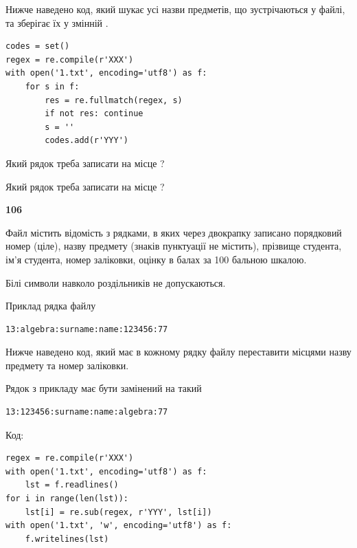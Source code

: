 Нижче наведено код, який шукає усі назви предметів, що зустрічаються у файлі, та зберігає їх у змінній .



\begin{verbatim}
codes = set()
regex = re.compile(r'XXX')
with open('1.txt', encoding='utf8') as f:
    for s in f:
        res = re.fullmatch(regex, s)
        if not res: continue
        s = ''
        codes.add(r'YYY')
\end{verbatim}





Який рядок треба записати на місце  ?\par
\vspace{5mm}


Який рядок треба записати на місце  ?\par


\newpage

{\begin {center}\textbf{ 106}\end {center}}\par
Файл  містить відомість з рядками, в яких через двокрапку записано поряд\-ковий номер (ціле), назву предмету (знаків пунктуації не містить), прізвище студента, ім'я студента, номер заліковки, оцінку в балах за 100 бальною шкалою.

Білі символи навколо роздільників не допускаються.

Приклад рядка файлу



\begin{verbatim}
13:algebra:surname:name:123456:77
\end{verbatim}


Нижче наведено код, який має в кожному рядку файлу переставити місцями назву предмету та номер заліковки.

Рядок з прикладу має бути замінений на такий



\begin{verbatim}
13:123456:surname:name:algebra:77
\end{verbatim}




Код:



\begin{verbatim}
regex = re.compile(r'XXX')
with open('1.txt', encoding='utf8') as f:
    lst = f.readlines()
for i in range(len(lst)):
    lst[i] = re.sub(regex, r'YYY', lst[i])
with open('1.txt', 'w', encoding='utf8') as f:
    f.writelines(lst)
\end{verbatim}








